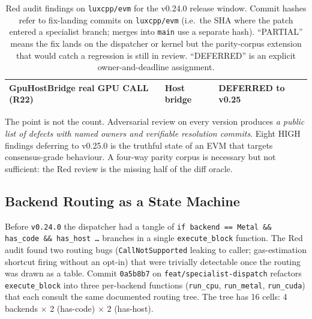 \begin{table}[h]
\begin{tabular}{lll}
GpuHostBridge real GPU CALL (R22)       & Host bridge     & DEFERRED to v0.25 \\
\bottomrule
\end{tabular}
\caption{Red audit findings on \texttt{luxcpp/evm} for the v0.24.0
release window. Commit hashes refer to fix-landing commits on
\texttt{luxcpp/evm} (i.e.\ the SHA where the patch entered a
specialist branch; merges into \texttt{main} use a separate hash).
``PARTIAL'' means the fix lands on the dispatcher or kernel but the
parity-corpus extension that would catch a regression is still in review.
``DEFERRED'' is an explicit owner-and-deadline assignment.}
\label{tab:v024-red-findings}
\end{table}

The point is not the count. Adversarial review on every version produces
\emph{a public list of defects with named owners and verifiable
resolution commits}. Eight HIGH findings deferring to v0.25.0 is the
truthful state of an EVM that targets consensus-grade behaviour. A
four-way parity corpus is necessary but not sufficient: the Red review
is the missing half of the diff oracle.

\subsection{Backend Routing as a State Machine}
\label{sec:v024:routing}

Before \texttt{v0.24.0} the dispatcher had a tangle of \texttt{if backend
== Metal \&\& has\_code \&\& has\_host \dots} branches in a single
\texttt{execute\_block} function. The Red audit found two routing bugs
(\texttt{CallNotSupported} leaking to caller; gas-estimation shortcut
firing without an opt-in) that were trivially detectable once the routing
was drawn as a table. Commit \texttt{0a5b8b7} on
\texttt{feat/specialist-dispatch} refactors \texttt{execute\_block} into
three per-backend functions (\texttt{run\_cpu}, \texttt{run\_metal},
\texttt{run\_cuda}) that each consult the same documented routing tree.
The tree has 16 cells: 4 backends $\times$ 2 (has-code) $\times$ 2
(has-host).

